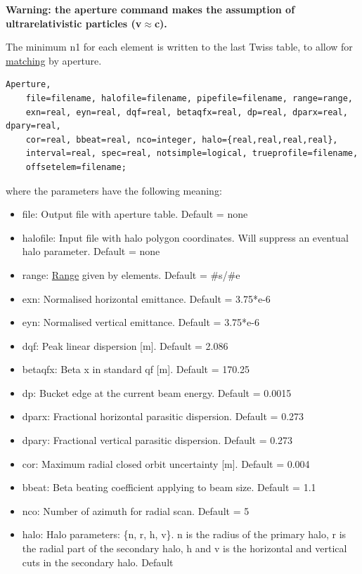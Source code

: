 {\bf Warning: the aperture command makes the assumption of ultrarelativistic
particles (v\(\approx\)c).}

The minimum n1 for each element is written to the last Twiss table, to
allow for \href{../match/match.html}{matching} by aperture.   
	
\begin{verbatim}
Aperture,
    file=filename, halofile=filename, pipefile=filename, range=range,
    exn=real, eyn=real, dqf=real, betaqfx=real, dp=real, dparx=real, dpary=real,
    cor=real, bbeat=real, nco=integer, halo={real,real,real,real},
    interval=real, spec=real, notsimple=logical, trueprofile=filename,
    offsetelem=filename;
\end{verbatim} 
where the parameters have the following meaning: 
\begin{itemize}
   \item file: Output file with aperture table. Default = none 
   \item halofile: Input file with halo polygon coordinates. Will
     suppress  an eventual halo parameter. Default = none  
   \item range: \href{../Introduction/ranges.html}{Range} given by
     elements. Default = \#s/\#e  
   \item exn: Normalised horizontal emittance. Default = 3.75*e-6  
   \item eyn: Normalised vertical emittance. Default = 3.75*e-6 
   \item dqf: Peak linear dispersion [m]. Default = 2.086 
   \item betaqfx: Beta x in standard qf [m]. Default = 170.25 
   \item dp: Bucket edge at the current beam energy. Default = 0.0015 
   \item dparx: Fractional horizontal parasitic dispersion. Default = 0.273 
   \item dpary: Fractional vertical parasitic dispersion. Default = 0.273 
   \item cor: Maximum radial closed orbit uncertainty [m]. Default = 0.004 
   \item bbeat: Beta beating coefficient applying to beam size. Default = 1.1 
   \item nco: Number of azimuth for radial scan. Default = 5 
   \item halo: Halo parameters: \{n, r, h, v\}. n is the radius of the
     primary halo,  r is the radial part of the secondary halo, h and v
     is the horizontal and  vertical cuts in the secondary halo. Default

\end{itemize}
